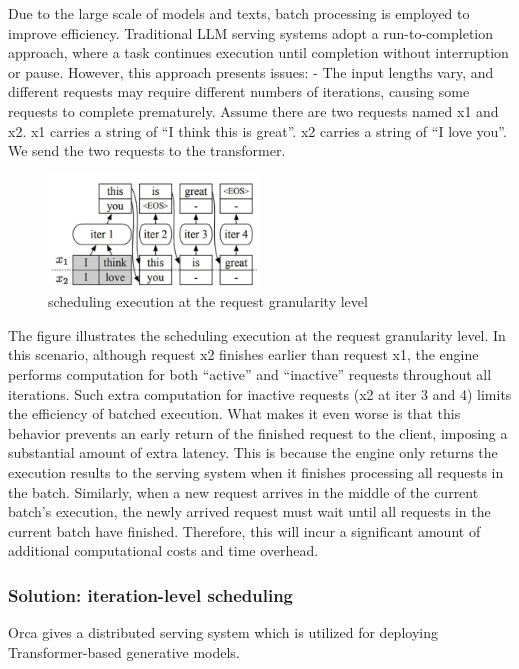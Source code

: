 \documentclass[conference]{IEEEtran}
\begin{document}
Due to the large scale of models and texts, batch processing is employed to improve efficiency. Traditional LLM serving systems adopt a run-to-completion approach, where a task continues execution until completion without interruption or pause. However, this approach presents issues:
- The input lengths vary, and different requests may require different numbers of iterations, causing some requests to complete prematurely.
Assume there are two requests named x1 and x2. x1 carries a string of “I think this is great”. x2 carries a string of “I love you”. We send the two requests to the transformer.
\begin{figure}[htbp]
    \centerline{\includegraphics[width=0.5\textwidth]{process fig1.png}}
    \caption{scheduling execution at the request granularity level}
    \label{fig}
\end{figure}
The figure illustrates the scheduling execution at the request granularity level. In this scenario,
although request x2 finishes earlier than request x1, the engine performs computation for both “active” and “inactive” requests throughout all iterations. Such extra computation for inactive requests (x2 at iter 3 and 4) limits the efficiency of batched execution. What makes it even worse is that this behavior prevents an early return of the finished request to the client, imposing a substantial amount of extra latency. This is because the engine only returns the execution results to the serving system when it finishes processing all requests in the batch. Similarly, when a new request arrives in the middle of the current batch’s execution, the newly arrived request must wait until all requests in the current batch have finished. Therefore, this will incur a significant amount of additional computational costs and time overhead. \cite{b10}


\subsubsection{Solution: iteration-level scheduling}


Orca gives a distributed serving system which is utilized for deploying Transformer-based generative models.
\end{document}
